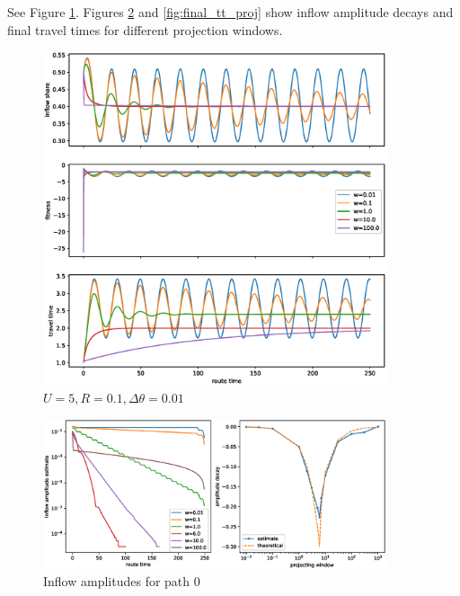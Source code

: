 \documentclass[12pt]{article}
\begin{document}
See Figure \ref{fig:fluctuations_proj}. Figures \ref{fig:amplitudes_proj} and \ref{fig:final_tt_proj} show inflow amplitude decays and final travel times for different projection windows.

\begin{figure}
	\includegraphics[width=0.9\textwidth]{img/replicator_proj_tt.eps}
	\caption{ $ U = 5, R=0.1, \Delta \theta = 0.01$}
	\label{fig:fluctuations_proj}

\end{figure}
	
\begin{figure}
	\includegraphics[width=0.9\textwidth]{img/amplitudes_proj_tt.eps}
	\caption{ Inflow amplitudes for path 0 }
	\label{fig:amplitudes_proj}

\end{figure}
\end{document}
